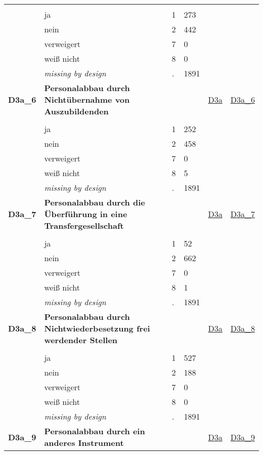 \begin{longtable}{| L{2.45cm} | L{6cm} | C{1.5cm} | R{1cm} | C{2.25cm} | C{2.25cm} |}
   &  &  &  &  &  \\ 
   & ja & 1 & 273 &  &  \\ 
   & nein & 2 & 442 &  &  \\ 
   & verweigert & 7 & 0 &  &  \\ 
   & weiß nicht & 8 & 0 &  &  \\ 
   & \textit{missing by design} & \textit{.} & 1891 &  &  \\ 
   \midrule
\textbf{D3a\_6}\label{var:D3a:6} & \textbf{Personalabbau durch Nichtübernahme von Auszubildenden} &  &  & \hyperref[D3a]{D3a} & \hyperref[var:suf:D3a:6]{D3a\_6} \\ 
   &  &  &  &  &  \\ 
   & ja & 1 & 252 &  &  \\ 
   & nein & 2 & 458 &  &  \\ 
   & verweigert & 7 & 0 &  &  \\ 
   & weiß nicht & 8 & 5 &  &  \\ 
   & \textit{missing by design} & \textit{.} & 1891 &  &  \\ 
   \midrule
\textbf{D3a\_7}\label{var:D3a:7} & \textbf{Personalabbau durch die Überführung in eine Transfergesellschaft} &  &  & \hyperref[D3a]{D3a} & \hyperref[var:suf:D3a:7]{D3a\_7} \\ 
   &  &  &  &  &  \\ 
   & ja & 1 & 52 &  &  \\ 
   & nein & 2 & 662 &  &  \\ 
   & verweigert & 7 & 0 &  &  \\ 
   & weiß nicht & 8 & 1 &  &  \\ 
   & \textit{missing by design} & \textit{.} & 1891 &  &  \\ 
   \midrule
\textbf{D3a\_8}\label{var:D3a:8} & \textbf{Personalabbau durch Nichtwiederbesetzung frei werdender Stellen} &  &  & \hyperref[D3a]{D3a} & \hyperref[var:suf:D3a:8]{D3a\_8} \\ 
   &  &  &  &  &  \\ 
   & ja & 1 & 527 &  &  \\ 
   & nein & 2 & 188 &  &  \\ 
   & verweigert & 7 & 0 &  &  \\ 
   & weiß nicht & 8 & 0 &  &  \\ 
   & \textit{missing by design} & \textit{.} & 1891 &  &  \\ 
   \midrule
\textbf{D3a\_9}\label{var:D3a:9} & \textbf{Personalabbau durch ein anderes Instrument} &  &  & \hyperref[D3a]{D3a} & \hyperref[var:suf:D3a:9]{D3a\_9} \\ 

\end{longtable}
